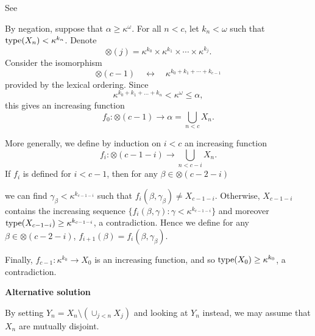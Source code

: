 See \cite{WangFrederic}

By negation, suppose that \(\alpha \geq \kappa^\omega\).
For all \(n<c\), let \(k_n<\omega\) such that
\(\mathop{\mathrm{type}}(X_n)<\kappa^{k_n}\).
Denote
\begin{equation*}
\otimes(j) = \kappa^{k_0} \times \kappa^{k_1} \times \cdots \times \kappa^{k_j}.
\end{equation*}
Consider the isomorphism
\begin{equation*}
\otimes(c-1)
\quad\leftrightarrow\quad
\kappa^{k_0+k_1+ \cdots + k_{c-1}}
\end{equation*}
provided by the lexical ordering.
Since
\begin{equation*}
\kappa^{k_0+k_1+ \dots +k_n} < \kappa^\omega  \leq \alpha,
\end{equation*}
this gives an increasing function
\begin{equation*}
f_0 : \otimes(c-1)
\to \alpha = \bigcup_{n<c} X_n.
\end{equation*}

More generally, we define by induction on \(i<c\) an increasing function
\begin{equation*}
f_i : \otimes(c-1-i)
\to
\bigcup_{n<c-i} X_n.
\end{equation*}
If \(f_i\) is defined for \(i<c-1\), then
for any
\(\beta \in \otimes(c-2-i)\)
\iffalse
\begin{equation*}
\beta \in \kappa^{k_0} \times \kappa^{k_1} \times \dots \kappa^{k_{c-2-i}}
\end{equation*}
\fi
we can find \(\gamma_\beta <\kappa^{k_{c-1-i}}\) such that
\(f_i(\beta, \gamma_\beta) \neq X_{c-1-i}\).
Otherwise, \(X_{c-1-i}\) contains the increasing sequence
\(\{f_i(\beta,\gamma): \gamma < \kappa^{k_{c-1-i}}\}\)
and moreover \(\mathop{\mathrm{type}}(X_{c-1-i}) \geq \kappa^{k_{c-1-i}}\),
a contradiction.
Hence we define for any
\(\beta \in \otimes(c-2-i)\),
\(f_{i+1}(\beta) = f_i(\beta, \gamma_\beta)\).

Finally, \(f_{c-1}: \kappa^{k_0} \to X_0\)
is an increasing function,
and so \(\mathop{\mathrm{type}}(X_0) \geq \kappa^{k_0}\),
a contradiction.

\unfinished

\textbf{Alternative solution}

By setting \(Y_n = X_n \setminus \left(\cup_{j<n} X_j\right)\)
and looking at \(Y_n\) instead, we may assume that \(X_n\)
are mutually disjoint.

\unfinished
